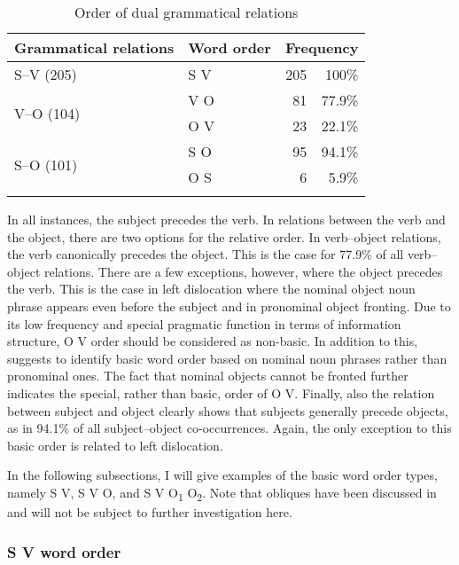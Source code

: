 \begin{table}

\begin{tabular}{llrr}
 \lsptoprule
Grammatical relations & Word order & \multicolumn{2}{c}{Frequency}\\\midrule
S--V        (205)                  &  S V & 205 & 100\% \\  \midrule
\multirow{2}{*}{V--O (104)} &  V O & 81 & 77.9\%  \\
                                  & O V & 23  & 22.1\% \\  \midrule
\multirow{2}{*}{S--O (101)} &  S O &  95 & 94.1\% \\
                                  & O S &  6     & 5.9\% \\
 \lspbottomrule
\end{tabular}
\caption{Order of dual grammatical relations}
\label{Tab:dualGram}
\end{table}

In all instances, the subject precedes the verb. In relations between the verb and the object, there are two options for the relative order. In verb--object relations, the verb canonically precedes the object. This is the case for 77.9\% of all verb--object relations. There are a few exceptions, however, where the object precedes the verb. This is the case in left dislocation where the nominal object noun phrase appears even before the subject and in pronominal object fronting. Due to its low frequency and special pragmatic function in terms of information structure, O V order should be considered as non-basic. In addition to this, \citet[80]{dryer2007b} suggests to identify basic word order based on nominal noun phrases rather than pronominal ones. The fact that nominal objects cannot be fronted further indicates the special, rather than basic, order of O V.
Finally, also the relation between subject and object clearly shows that subjects generally precede objects, as in 94.1\% of all subject--object co-occurrences. Again, the only exception to this basic order is related to left dislocation.

In the following subsections, I will give examples of the basic word order types, namely S V, S V O, and S V O\textsubscript{1} O\textsubscript{2}. Note that obliques have been discussed in  and will not be subject to further investigation here.

\subsubsection{S V word order}
\label{sec:SV}

